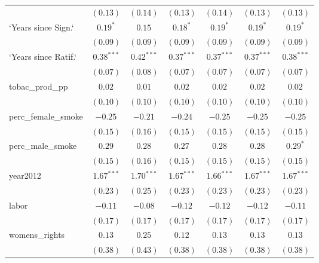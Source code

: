 \begin{table}[!h]
\begin{center}
\begin{tabular}{l c c c c c c }
                        & $(0.13)$     & $(0.14)$     & $(0.13)$     & $(0.14)$     & $(0.13)$     & $(0.13)$     \\
`Years since Sign.`     & $0.19^{*}$   & $0.15$       & $0.18^{*}$   & $0.19^{*}$   & $0.19^{*}$   & $0.19^{*}$   \\
                        & $(0.09)$     & $(0.09)$     & $(0.09)$     & $(0.09)$     & $(0.09)$     & $(0.09)$     \\
`Years since Ratif.`    & $0.38^{***}$ & $0.42^{***}$ & $0.37^{***}$ & $0.37^{***}$ & $0.37^{***}$ & $0.38^{***}$ \\
                        & $(0.07)$     & $(0.08)$     & $(0.07)$     & $(0.07)$     & $(0.07)$     & $(0.07)$     \\
tobac\_prod\_pp         & $0.02$       & $0.01$       & $0.02$       & $0.02$       & $0.02$       & $0.02$       \\
                        & $(0.10)$     & $(0.10)$     & $(0.10)$     & $(0.10)$     & $(0.10)$     & $(0.10)$     \\
perc\_female\_smoke     & $-0.25$      & $-0.21$      & $-0.24$      & $-0.25$      & $-0.25$      & $-0.25$      \\
                        & $(0.15)$     & $(0.16)$     & $(0.15)$     & $(0.15)$     & $(0.15)$     & $(0.15)$     \\
perc\_male\_smoke       & $0.29$       & $0.28$       & $0.27$       & $0.28$       & $0.28$       & $0.29^{*}$   \\
                        & $(0.15)$     & $(0.16)$     & $(0.15)$     & $(0.15)$     & $(0.15)$     & $(0.15)$     \\
year2012                & $1.67^{***}$ & $1.70^{***}$ & $1.67^{***}$ & $1.66^{***}$ & $1.67^{***}$ & $1.67^{***}$ \\
                        & $(0.23)$     & $(0.25)$     & $(0.23)$     & $(0.23)$     & $(0.23)$     & $(0.23)$     \\
labor                   & $-0.11$      & $-0.08$      & $-0.12$      & $-0.12$      & $-0.12$      & $-0.11$      \\
                        & $(0.17)$     & $(0.17)$     & $(0.17)$     & $(0.17)$     & $(0.17)$     & $(0.17)$     \\
womens\_rights          & $0.13$       & $0.25$       & $0.12$       & $0.13$       & $0.13$       & $0.13$       \\
                        & $(0.38)$     & $(0.43)$     & $(0.38)$     & $(0.38)$     & $(0.38)$     & $(0.38)$     \\

\end{tabular}
\end{center}
\end{table}
